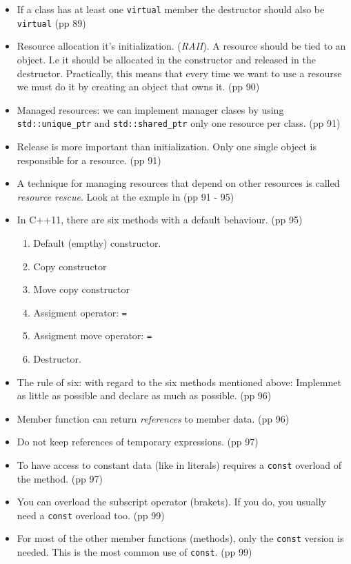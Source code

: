 \begin{itemize}
 \item If a class has at least one \texttt{virtual} member the destructor should also be \texttt{virtual} (pp 89)
 \item Resource allocation it's initialization. (\emph{RAII}). A resource should be tied to an object. I.e it should be allocated in the constructor and released in the destructor. Practically, this means that every time we want to use a resourse we must do it by creating an object that owns it. (pp 90)
 \item Managed resources: we can implement manager clases by using \texttt{std::unique_ptr} and \texttt{std::shared_ptr} only one resource per class. (pp 91)
 \item Release is more important than initialization. Only one single object is responsible for a resource. (pp 91)
 \item A technique for managing resources that depend on other resources is called \emph{resource rescue}. Look at the exmple in (pp 91 - 95)
 \item In C++11, there are six methods with a default behaviour. (pp 95)
 \begin{enumerate}
  \item Default (empthy) constructor.
  \item Copy constructor
  \item Move copy constructor
  \item Assigment operator: \texttt{=}
  \item Assigment move operator: \texttt{=}
  \item Destructor.
 \end{enumerate}
  \item The rule of six: with regard to the six methods mentioned above: Implemnet as little as possible and declare as much as possible. (pp 96)
  \item Member function can return \emph{references} to member data. (pp 96)
  \item Do not keep references of temporary expressions. (pp 97)
  \item To have access to constant data (like in literals) requires a \texttt{const} overload of the method. (pp 97)
  \item You can overload the subscript operator (brakets). If you do, you usually need a \texttt{const} overload too. (pp 99)
  \item For most of the other member functions (methods), only the \texttt{const} version is needed. This is the most common use of \texttt{const}. (pp 99)

\end{itemize}
